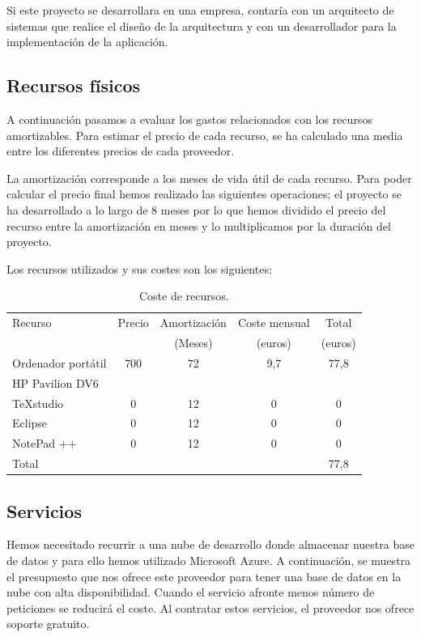 \documentclass[12pt]{report} %
\begin{document}
Si este proyecto se desarrollara en una empresa, contaría con un arquitecto de sistemas que realice el diseño de la arquitectura y con un desarrollador para la implementación de la aplicación.

\subsection{Recursos físicos}
A continuación pasamos a evaluar los gastos relacionados con los recursos amortizables. 
Para estimar el precio de cada recurso, se ha calculado una media entre los diferentes precios de cada proveedor. 

La amortización corresponde a los meses de vida útil de cada recurso.
Para poder calcular el precio final hemos realizado las siguientes operaciones; el proyecto se ha desarrollado a lo largo de 8 meses por lo que hemos dividido el precio del recurso entre la amortización en meses y lo multiplicamos por la duración del proyecto.

Los recursos utilizados y sus costes son los siguientes:

\begin{table}[H]
	\begin{center}
		\begin{tabular}{|l|c|c|c|c|}
			\hline
			Recurso & Precio & Amortización & Coste mensual & Total \\
			 &  & (Meses) & (euros) & (euros) \\
			\hline \hline
			Ordenador portátil & 700 & 72 & 9,7 & 77,8 \\ 
			HP Pavilion DV6 &  &  &  &  \\ 
			\hline
			TeXstudio & 0 & 12 & 0 & 0 \\ \hline
			Eclipse & 0 & 12 & 0 & 0 \\ \hline
			NotePad ++ & 0 & 12 & 0 & 0 \\ \hline \hline
			Total & & & & 77,8 \\ \hline
			
		\end{tabular}
		\caption{Coste de recursos.}		
		\label{costeRecursos}
	\end{center}
\end{table}

\subsection{Servicios}
Hemos necesitado recurrir a una nube de desarrollo donde almacenar nuestra base de datos y para ello hemos utilizado Microsoft Azure. A continuación, se muestra el presupuesto que nos ofrece este proveedor para tener una base de datos en la nube con alta disponibilidad. Cuando el servicio afronte menos número de peticiones se reducirá el coste. Al contratar estos servicios, el proveedor nos ofrece soporte gratuito.
\end{document}
